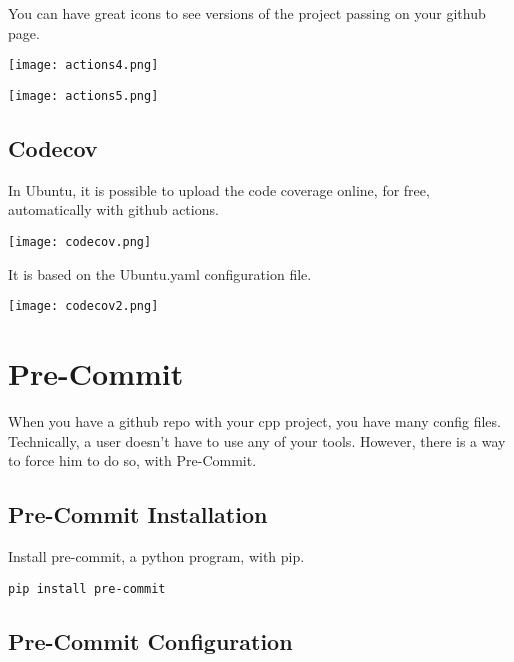 \documentclass[openany]{report}
\begin{document}
You can have great icons to see versions of the project passing on your github page.


\begin{center}
    \texttt{[image: actions4.png]}
\end{center}


\begin{center}
    \texttt{[image: actions5.png]}
\end{center}


\subsection{Codecov}

In Ubuntu, it is possible to upload the code coverage online, for free, automatically with github actions.

\begin{center}
    \texttt{[image: codecov.png]}
\end{center}

It is based on the Ubuntu.yaml configuration file.

\begin{center}
    \texttt{[image: codecov2.png]}
\end{center}



\section{Pre-Commit}

When you have a github repo with your cpp project, you have many config files. Technically,
a user doesn't have to use any of your tools. However, there is a way to force him to do so, with 
Pre-Commit.


\subsection{Pre-Commit Installation}

Install pre-commit, a python program, with pip.

\begin{verbatim}
pip install pre-commit
\end{verbatim}


\subsection{Pre-Commit Configuration}
\end{document}
